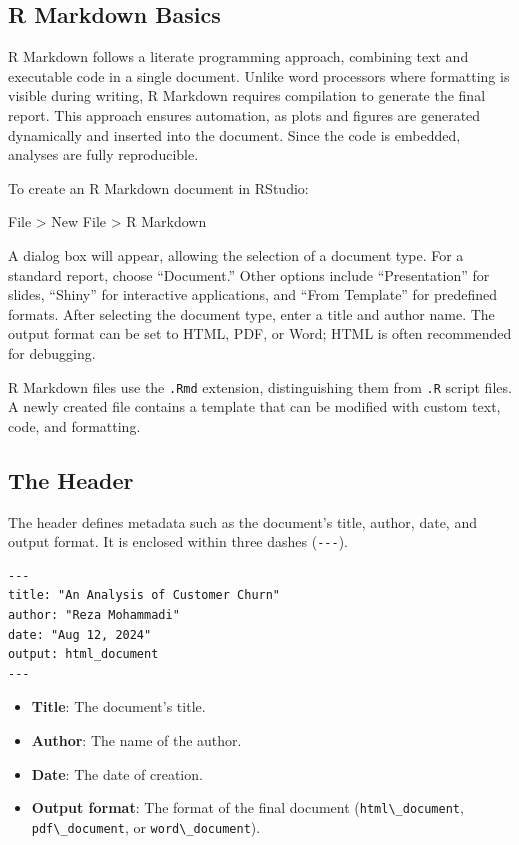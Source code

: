 \documentclass[
  11pt,
]{book}
\newcommand{\passthrough}[1]{#1}
\providecommand{\tightlist}{%
  \setlength{\itemsep}{0pt}\setlength{\parskip}{0pt}}
\theoremstyle{definition}
\theoremstyle{definition}
\theoremstyle{definition}
\theoremstyle{definition}
\theoremstyle{remark}
\begin{document}
\subsection*{R Markdown Basics}\label{r-markdown-basics}


R Markdown follows a literate programming approach, combining text and executable code in a single document. Unlike word processors where formatting is visible during writing, R Markdown requires compilation to generate the final report. This approach ensures automation, as plots and figures are generated dynamically and inserted into the document. Since the code is embedded, analyses are fully reproducible.

To create an R Markdown document in RStudio:

File \textgreater{} New File \textgreater{} R Markdown

A dialog box will appear, allowing the selection of a document type. For a standard report, choose ``Document.'' Other options include ``Presentation'' for slides, ``Shiny'' for interactive applications, and ``From Template'' for predefined formats. After selecting the document type, enter a title and author name. The output format can be set to HTML, PDF, or Word; HTML is often recommended for debugging.

R Markdown files use the \passthrough{\lstinline!.Rmd!} extension, distinguishing them from \passthrough{\lstinline!.R!} script files. A newly created file contains a template that can be modified with custom text, code, and formatting.

\subsection*{The Header}\label{the-header}


The header defines metadata such as the document's title, author, date, and output format. It is enclosed within three dashes (\passthrough{\lstinline!---!}).

\begin{lstlisting}
---
title: "An Analysis of Customer Churn"
author: "Reza Mohammadi"
date: "Aug 12, 2024"
output: html_document
---
\end{lstlisting}

\begin{itemize}
\tightlist
\item
  \textbf{Title}: The document's title.\\
\item
  \textbf{Author}: The name of the author.\\
\item
  \textbf{Date}: The date of creation.\\
\item
  \textbf{Output format}: The format of the final document (\passthrough{\lstinline!html\_document!}, \passthrough{\lstinline!pdf\_document!}, or \passthrough{\lstinline!word\_document!}).
\end{itemize}
\end{document}
